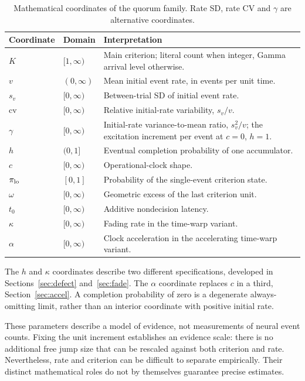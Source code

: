 \documentclass[12pt]{article}
\theoremstyle{definition}
\theoremstyle{plain}
\theoremstyle{remark}
\begin{document}
\begin{table}[htbp]
\centering\small
\caption{Mathematical coordinates of the quorum family. Rate SD, rate CV and $\gamma$ are alternative coordinates.}
\label{tab:parameters}
\begin{tabular}{L{2.0cm}L{2.2cm}L{9.1cm}}
\toprule
Coordinate & Domain & Interpretation\\
\midrule
$K$ & $[1,\infty)$ & Main criterion; literal count when integer, Gamma arrival level otherwise.\\
$v$ & $(0,\infty)$ & Mean initial event rate, in events per unit time.\\
$s_v$ & $[0,\infty)$ & Between-trial SD of initial event rate.\\
$\mathrm{cv}$ & $[0,\infty)$ & Relative initial-rate variability, $s_v/v$.\\
$\gamma$ & $[0,\infty)$ & Initial-rate variance-to-mean ratio, $s_v^2/v$; the excitation increment per event at $c=0$, $h=1$.\\
$h$ & $(0,1]$ & Eventual completion probability of one accumulator.\\
$c$ & $[0,\infty)$ & Operational-clock shape.\\
$\pi_{\rm lo}$ & $[0,1]$ & Probability of the single-event criterion state.\\
$\omega$ & $[0,\infty)$ & Geometric excess of the last criterion unit.\\
$t_0$ & $[0,\infty)$ & Additive nondecision latency.\\
$\kappa$ & $[0,\infty)$ & Fading rate in the time-warp variant.\\
$\alpha$ & $[0,\infty)$ & Clock acceleration in the accelerating time-warp variant.\\
\bottomrule
\end{tabular}
\end{table}
The $h$ and $\kappa$ coordinates describe two different specifications, developed in Sections~\ref{sec:defect} and~\ref{sec:fade}. The $\alpha$ coordinate replaces $c$ in a third, Section~\ref{sec:accel}. A completion probability of zero is a degenerate always-omitting limit, rather than an interior coordinate with positive initial rate.

These parameters describe a model of evidence, not measurements of neural event counts. Fixing the unit increment establishes an evidence scale: there is no additional free jump size that can be rescaled against both criterion and rate. Nevertheless, rate and criterion can be difficult to separate empirically. Their distinct mathematical roles do not by themselves guarantee precise estimates.
\end{document}

